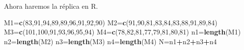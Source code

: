\documentclass[
  a4paper,
  oneside,
  openany]{book}
\newenvironment{Shaded}{\begin{snugshade}}{\end{snugshade}}
\newcommand{\DecValTok}[1]{\textcolor[rgb]{0.00,0.00,0.81}{#1}}
\newcommand{\KeywordTok}[1]{\textcolor[rgb]{0.13,0.29,0.53}{\textbf{#1}}}
\newcommand{\NormalTok}[1]{#1}
\newcommand{\OperatorTok}[1]{\textcolor[rgb]{0.81,0.36,0.00}{\textbf{#1}}}
\begin{document}
Ahora haremos la réplica en R.

\begin{Shaded}
\begin{Highlighting}[]
\NormalTok{M1=}\KeywordTok{c}\NormalTok{(}\DecValTok{83}\NormalTok{,}\DecValTok{91}\NormalTok{,}\DecValTok{94}\NormalTok{,}\DecValTok{89}\NormalTok{,}\DecValTok{89}\NormalTok{,}\DecValTok{96}\NormalTok{,}\DecValTok{91}\NormalTok{,}\DecValTok{92}\NormalTok{,}\DecValTok{90}\NormalTok{)}
\NormalTok{M2=}\KeywordTok{c}\NormalTok{(}\DecValTok{91}\NormalTok{,}\DecValTok{90}\NormalTok{,}\DecValTok{81}\NormalTok{,}\DecValTok{83}\NormalTok{,}\DecValTok{84}\NormalTok{,}\DecValTok{83}\NormalTok{,}\DecValTok{88}\NormalTok{,}\DecValTok{91}\NormalTok{,}\DecValTok{89}\NormalTok{,}\DecValTok{84}\NormalTok{)}
\NormalTok{M3=}\KeywordTok{c}\NormalTok{(}\DecValTok{101}\NormalTok{,}\DecValTok{100}\NormalTok{,}\DecValTok{91}\NormalTok{,}\DecValTok{93}\NormalTok{,}\DecValTok{96}\NormalTok{,}\DecValTok{95}\NormalTok{,}\DecValTok{94}\NormalTok{)}
\NormalTok{M4=}\KeywordTok{c}\NormalTok{(}\DecValTok{78}\NormalTok{,}\DecValTok{82}\NormalTok{,}\DecValTok{81}\NormalTok{,}\DecValTok{77}\NormalTok{,}\DecValTok{79}\NormalTok{,}\DecValTok{81}\NormalTok{,}\DecValTok{80}\NormalTok{,}\DecValTok{81}\NormalTok{)}
\NormalTok{n1=}\KeywordTok{length}\NormalTok{(M1)}
\NormalTok{n2=}\KeywordTok{length}\NormalTok{(M2)}
\NormalTok{n3=}\KeywordTok{length}\NormalTok{(M3)}
\NormalTok{n4=}\KeywordTok{length}\NormalTok{(M4)}
\NormalTok{N=n1}\OperatorTok{+}\NormalTok{n2}\OperatorTok{+}\NormalTok{n3}\OperatorTok{+}\NormalTok{n4}


\end{Highlighting}
\end{Shaded}
\end{document}
